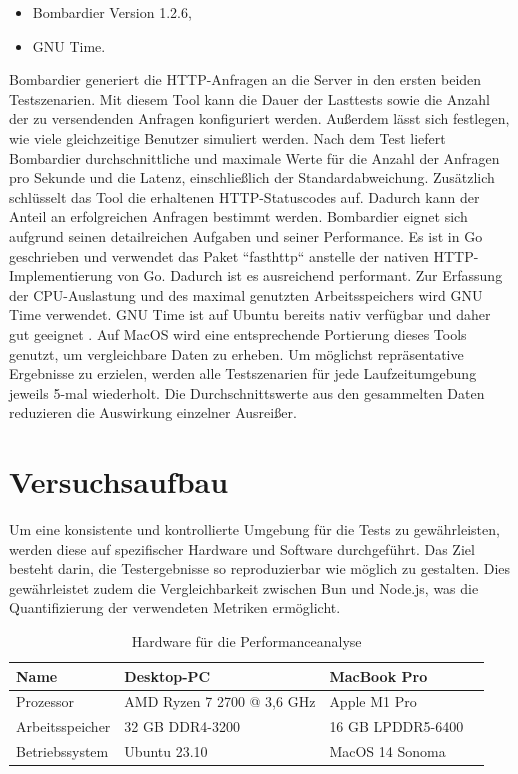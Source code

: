 \begin{itemize}
	\item Bombardier Version 1.2.6,
	\item GNU Time.
\end{itemize}

\noindent
Bombardier generiert die HTTP-Anfragen an die Server in den ersten beiden Testszenarien. Mit diesem Tool kann die Dauer der Lasttests sowie die Anzahl der zu versendenden Anfragen konfiguriert werden. Außerdem lässt sich festlegen, wie viele gleichzeitige Benutzer simuliert werden. Nach dem Test liefert Bombardier durchschnittliche und maximale Werte für die Anzahl der Anfragen pro Sekunde und die Latenz, einschließlich der Standardabweichung. Zusätzlich schlüsselt das Tool die erhaltenen HTTP-Statuscodes auf. Dadurch kann der Anteil an erfolgreichen Anfragen bestimmt werden. Bombardier eignet sich aufgrund seinen detailreichen Aufgaben und seiner Performance. Es ist in Go geschrieben und verwendet das Paket ``fasthttp`` anstelle der nativen HTTP-Implementierung von Go. Dadurch ist es ausreichend performant.\cite{Fedoseev.2016}\newline
Zur Erfassung der CPU-Auslastung und des maximal genutzten Arbeitsspeichers wird GNU Time verwendet. GNU Time ist auf Ubuntu bereits nativ verfügbar und daher gut geeignet \cite{FreeSoftwareFoundation.2018}. Auf MacOS wird eine entsprechende Portierung dieses Tools genutzt, um vergleichbare Daten zu erheben.\newline
Um möglichst repräsentative Ergebnisse zu erzielen, werden alle Testszenarien für jede Laufzeitumgebung jeweils 5-mal wiederholt. Die Durchschnittswerte aus den gesammelten Daten reduzieren die Auswirkung einzelner Ausreißer.


\section{Versuchsaufbau} \label{sec:performance-testSetup}
Um eine konsistente und kontrollierte Umgebung für die Tests zu gewährleisten, werden diese auf spezifischer Hardware und Software durchgeführt. Das Ziel besteht darin, die Testergebnisse so reproduzierbar wie möglich zu gestalten. Dies gewährleistet zudem die Vergleichbarkeit zwischen Bun und Node.js, was die Quantifizierung der verwendeten Metriken ermöglicht.

\begin{table}[h]
	\centering
	\begin{tabular}{|p{4.5cm}|p{4.5cm}|p{4.5cm}|p{4.5cm}|}
		\hline
		Name & Desktop-PC & MacBook Pro \\
		\hline
		Prozessor & AMD Ryzen 7 2700 @ 3,6 GHz & Apple M1 Pro \\
		\hline
		Arbeitsspeicher & 32 GB DDR4-3200 & 16 GB LPDDR5-6400 \\
		\hline
		Betriebssystem & Ubuntu 23.10 & MacOS 14 Sonoma \\
		\hline
	\end{tabular}
	\caption{Hardware für die Performanceanalyse}
	\label{table:hardware}
\end{table}

